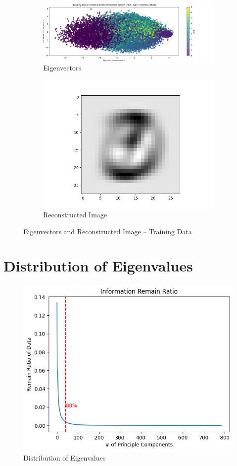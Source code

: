 \documentclass[a4paper]{article}
\begin{document}
\begin{figure}[H]
\centering
\begin{subfigure}{.5\linewidth}
\includegraphics[width=\linewidth]{PCA_Training}
\caption{Eigenvectors}
\end{subfigure}
\begin{subfigure}{.3\linewidth}
\includegraphics[width=\linewidth]{reconstruct_img}
\caption{Reconstructed Image}
\end{subfigure}
\caption{Eigenvectors and Reconstructed Image -- Training Data}
\end{figure}

\section{Distribution of Eigenvalues}

\begin{figure}[H]
\centering
\includegraphics[width=.275\linewidth]{Infotmation Remaining Ratio}
\caption{Distribution of Eigenvalues}
\end{figure}
\end{document}
